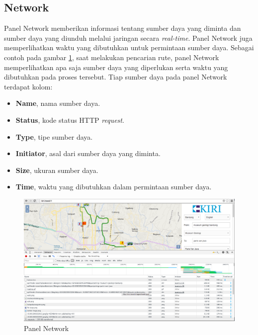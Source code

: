 \subsection{Network}
Panel Network memberikan informasi tentang sumber daya yang diminta dan sumber daya yang diunduh melalui jaringan secara \textit{real-time}. Panel Network juga memperlihatkan waktu yang dibutuhkan untuk permintaan sumber daya. Sebagai contoh pada gambar \ref{fig:2_devtools_network}, saat melakukan pencarian rute, panel Network memperlihatkan apa saja sumber daya yang diperlukan serta waktu yang dibutuhkan pada proses tersebut. Tiap sumber daya pada panel Network terdapat kolom:

\begin{itemize}
	\item \textbf{Name}, nama sumber daya.
	\item \textbf{Status}, kode status HTTP \textit{request}.
	\item \textbf{Type}, tipe sumber daya.
	\item \textbf{Initiator}, asal dari sumber daya yang diminta.
	\item \textbf{Size}, ukuran sumber daya.
	\item \textbf{Time}, waktu yang dibutuhkan dalam permintaan sumber daya.
\end{itemize}

\begin{figure}[H]
	\centering
	\includegraphics[scale=0.3]{Gambar/devtools-network}
	\caption{Panel Network} 
	\label{fig:2_devtools_network}
\end{figure}


